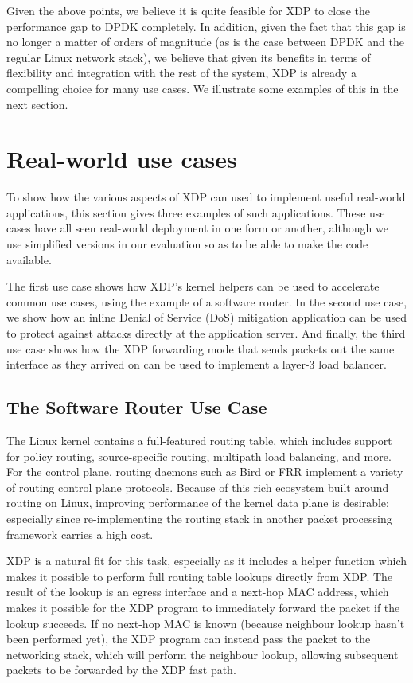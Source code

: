 \documentclass[10pt,sigconf,anonymous]{acmart}
\begin{document}
Given the above points, we believe it is quite feasible for XDP to close the
performance gap to DPDK completely. In addition, given the fact that this gap is
no longer a matter of orders of magnitude (as is the case between DPDK and the
regular Linux network stack), we believe that given its benefits in terms of
flexibility and integration with the rest of the system, XDP is already a
compelling choice for many use cases. We illustrate some examples of this in the
next section.

\section{Real-world use cases}
\label{sec:usecases}
To show how the various aspects of XDP can used to implement useful real-world
applications, this section gives three examples of such applications. These use
cases have all seen real-world deployment in one form or another, although we
use simplified versions in our evaluation so as to be able to make the code
available.

The first use case shows how XDP's kernel helpers can be used to accelerate
common use cases, using the example of a software router. In the second use
case, we show how an inline Denial of Service (DoS) mitigation application can
be used to protect against attacks directly at the application server. And
finally, the third use case shows how the XDP forwarding mode that sends packets
out the same interface as they arrived on can be used to implement a layer-3
load balancer.

\subsection{The Software Router Use Case}
\label{sec:fwd-usecase}
The Linux kernel contains a full-featured routing table, which includes support
for policy routing, source-specific routing, multipath load balancing, and more.
For the control plane, routing daemons such as Bird or FRR implement a variety
of routing control plane protocols. Because of this rich ecosystem built around
routing on Linux, improving performance of the kernel data plane is desirable;
especially since re-implementing the routing stack in another packet processing
framework carries a high cost.

XDP is a natural fit for this task, especially as it includes a helper function
which makes it possible to perform full routing table lookups directly from XDP.
The result of the lookup is an egress interface and a next-hop MAC address,
which makes it possible for the XDP program to immediately forward the packet if
the lookup succeeds. If no next-hop MAC is known (because neighbour lookup
hasn't been performed yet), the XDP program can instead pass the packet to the
networking stack, which will perform the neighbour lookup, allowing subsequent
packets to be forwarded by the XDP fast path.
\end{document}
